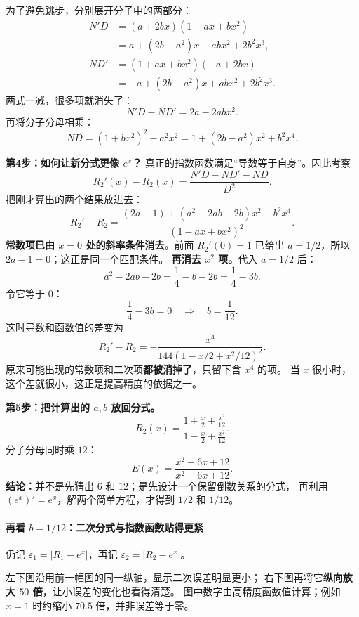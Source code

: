 \begin{proofbox}
为了避免跳步，分别展开分子中的两部分：
\[
\begin{aligned}
 N'D&=(a+2bx)(1-ax+bx^2)\\
 &=a+(2b-a^2)x-abx^2+2b^2x^3,\\
 ND'&=(1+ax+bx^2)(-a+2bx)\\
 &=-a+(2b-a^2)x+abx^2+2b^2x^3.
\end{aligned}
\]
两式一减，很多项就消失了：
\[
 N'D-ND'=2a-2abx^2.
\]
再将分子分母相乘：
\[
 ND=(1+bx^2)^2-a^2x^2
 =1+(2b-a^2)x^2+b^2x^4.
\]

\textbf{第4步：如何让新分式更像 $e^x$？}
真正的指数函数满足“导数等于自身”。因此考察
\[
 R_2'(x)-R_2(x)
 =\frac{N'D-ND'-ND}{D^2}.
\]
把刚才算出的两个结果放进去：
\[
 \boxed{R_2'-R_2=
 \frac{(2a-1)+(a^2-2ab-2b)x^2-b^2x^4}
 {(1-ax+bx^2)^2}}.
\]
\textbf{常数项已由 $x=0$ 处的斜率条件消去。}前面 $R_2'(0)=1$ 已给出 $a=1/2$，所以 $2a-1=0$；这正是同一个匹配条件。
\textbf{再消去 $x^2$ 项。}代入 $a=1/2$ 后：
\[
 a^2-2ab-2b=\frac14-b-2b=\frac14-3b.
\]
令它等于 $0$：
\[
 \frac14-3b=0\quad\Longrightarrow\quad \boxed{b=\frac1{12}}.
\]
这时导数和函数值的差变为
\[
 R_2'-R_2=-\frac{x^4}{144(1-x/2+x^2/12)^2}.
\]
原来可能出现的常数项和二次项\textbf{都被消掉了}，只留下含 $x^4$ 的项。
当 $x$ 很小时，这个差就很小，这正是提高精度的依据之一。

\textbf{第5步：把计算出的 $a,b$ 放回分式。}
\[
 R_2(x)=\frac{1+\frac x2+\frac{x^2}{12}}{1-\frac x2+\frac{x^2}{12}}.
\]
分子分母同时乘 $12$：
\[
 \boxed{E(x)=\frac{x^2+6x+12}{x^2-6x+12}}.
\]
\textbf{结论：}并不是先猜出 $6$ 和 $12$；是先设计一个保留倒数关系的分式，
再利用 $(e^x)'=e^x$，解两个简单方程，才得到 $1/2$ 和 $1/12$。

\newpage
\paragraph{再看 $b=1/12$：二次分式与指数函数贴得更紧}\mbox{}\par
仍记 $\varepsilon_1=|R_1-e^x|$，再记 $\varepsilon_2=|R_2-e^x|$。
\begin{center}\end{center}
左下图沿用前一幅图的同一纵轴，显示二次误差明显更小；
右下图再将它\textbf{纵向放大 $50$ 倍}，让小误差的变化也看得清楚。
图中数字由高精度函数值计算；例如 $x=1$ 时约缩小 $70.5$ 倍，并非误差等于零。

\newpage

\end{proofbox}
